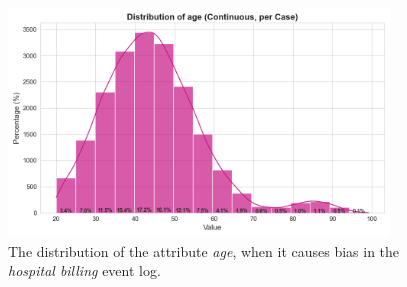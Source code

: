 \begin{figure}[h!]
    \centering
    \includegraphics[width=0.9\textwidth]{gfx/hb_age.png}
    \caption{The distribution of the attribute \textit{age},
    when it causes bias in the \textit{hospital billing} event log.}
    \label{fig:hb_age}
\end{figure}


